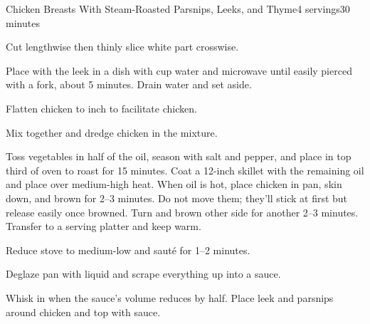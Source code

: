 \documentclass[../Cookbook.tex]{subfiles}
\begin{document}
\begin{recipe}{Chicken Breasts With Steam-Roasted Parsnips, Leeks, and Thyme}{4 servings}{30 minutes}

Cut lengthwise then thinly slice white part crosswise.

Place with the leek in a dish with  cup water and microwave until easily pierced with a fork, about 5 minutes. Drain water and set aside.

 Flatten chicken to  inch to facilitate chicken.

Mix together and dredge chicken in the mixture.

Toss vegetables in half of the oil, season with salt and pepper, and place in top third of oven to roast for 15 minutes.
Coat a 12-inch skillet with the remaining oil and place over medium-high heat. When oil is hot, place chicken in pan, skin down, and brown for 2--3 minutes. Do not move them; they'll stick at first but release easily once browned. Turn and brown other side for another 2--3 minutes. Transfer to a serving platter and keep warm.

Reduce stove to medium-low and saut\'e for 1--2 minutes.

Deglaze pan with liquid and scrape everything up into a sauce.

Whisk in when the sauce's volume reduces by half. Place leek and parsnips around chicken and top with sauce.

\end{recipe}
\end{document}

